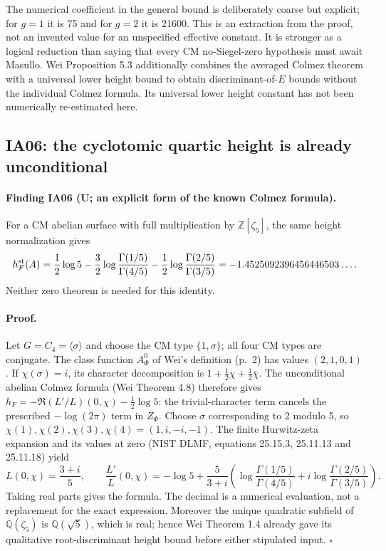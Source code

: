 \documentclass[11pt,a4paper]{article}
\theoremstyle{definition}
\begin{document}
The numerical coefficient in the general bound is deliberately coarse
but explicit; for $g=1$ it is 75 and for $g=2$ it is 21600.
This is an extraction from the proof, not an invented value for an
unspecified effective constant.  It is stronger as a logical reduction
than saying that every CM no-Siegel-zero hypothesis must await Masullo.
Wei Proposition 5.3 additionally combines the averaged Colmez theorem
with a universal lower height bound to obtain discriminant-of-$E$
bounds without the individual Colmez formula.  Its universal lower
height constant has not been numerically re-estimated here.

\subsection{IA06: the cyclotomic quartic height is already unconditional}

\paragraph{Finding IA06 (U; an explicit form of the known Colmez formula).}
For a CM abelian surface with full multiplication by
$\mathbb Z[\zeta_5]$, the same height normalization gives
\[
 h_F^{\rm st}(A)=\frac12\log5
 -\frac32\log\frac{\Gamma(1/5)}{\Gamma(4/5)}
 -\frac12\log\frac{\Gamma(2/5)}{\Gamma(3/5)}
 =-1.4525092396456446503\ldots.
\]
Neither zero theorem is needed for this identity.

\paragraph{Proof.}
Let $G=C_4=\langle\sigma\rangle$ and choose the CM type
$\{1,\sigma\}$; all four CM types are conjugate.  The class function
$A^0_\Phi$ of Wei's definition (p.~2) has values $(2,1,0,1)$.
If $\chi(\sigma)=i$, its character decomposition is
$1+\tfrac12\chi+\tfrac12\bar\chi$.
The unconditional abelian Colmez formula (Wei Theorem 4.8)
therefore gives
$h_F=-\Re(L'/L)(0,\chi)-\tfrac12\log5$:
the trivial-character term cancels the prescribed $-\log(2\pi)$
term in $Z_\Phi$.
Choose $\sigma$ corresponding to 2 modulo 5, so
$\chi(1),\chi(2),\chi(3),\chi(4)=(1,i,-i,-1)$.
The finite Hurwitz-zeta expansion and its values at zero
(NIST DLMF, equations 25.15.3, 25.11.13 and 25.11.18) yield
\[
 L(0,\chi)=\frac{3+i}{5},\qquad
 \frac{L'}L(0,\chi)=-\log5+
 \frac{5}{3+i}\left(
 \log\frac{\Gamma(1/5)}{\Gamma(4/5)}+
 i\log\frac{\Gamma(2/5)}{\Gamma(3/5)}\right).
\]
Taking real parts gives the formula.  The decimal is a numerical
evaluation, not a replacement for the exact expression.
Moreover the unique quadratic subfield of $\mathbb Q(\zeta_5)$ is
$\mathbb Q(\sqrt5)$, which is real; hence Wei Theorem 1.4 already
gave its qualitative root-discriminant height bound before either
stipulated input. \hfill$\square$
\end{document}
